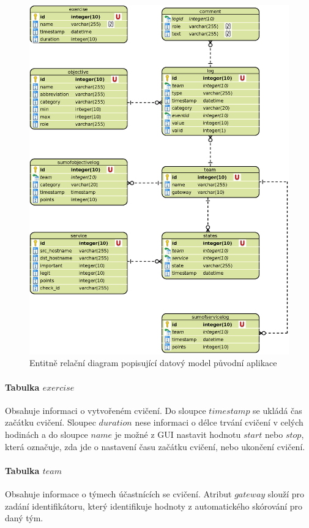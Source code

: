 \documentclass[
  digital,
  twoside,
  table, 
  nolof, 
  nolot
]{fithesis3}
\begin{document}
\begin{figure}[h!]
    \centering
    \includegraphics[width=13.5cm]{images/ERD-old-app.eps}
    \caption{Entitně relační diagram popisující datový model původní aplikace}
    \label{fig:erdOldApp}
\end{figure}

\paragraph{Tabulka $exercise$} Obsahuje informaci o vytvořeném cvičení. Do sloupce $timestamp$ se ukládá čas začátku cvičení. Sloupec $duration$ nese informaci o délce trvání cvičení v celých hodinách a do sloupce $name$ je možné z GUI nastavit hodnotu $start$ nebo $stop$, která označuje, zda jde o nastavení času začátku cvičení, nebo ukončení cvičení.

\paragraph{Tabulka $team$} Obsahuje informace o týmech účastnících se cvičení. Atribut $gateway$ slouží pro zadání identifikátoru, který identifikuje hodnoty z automatického skórování pro daný tým.
\end{document}
